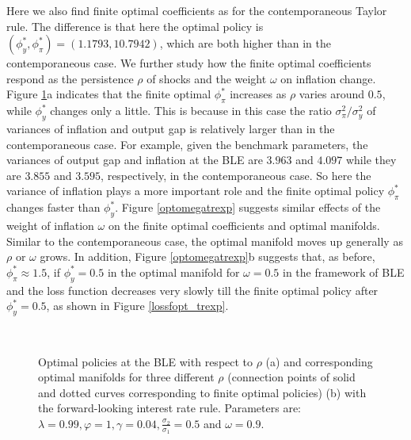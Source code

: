 
Here we also find finite optimal coefficients as for the contemporaneous Taylor rule. The difference is that here the optimal policy is $(\phi_y^*, \phi_\pi^*)=(1.1793,10.7942)$, which are both higher than in the contemporaneous case. We further study how the finite optimal coefficients respond as the persistence $\rho$ of shocks and the weight $\omega$ on inflation change. Figure \ref{optrhotrexp}a indicates that the finite optimal $\phi_\pi^*$ increases as $\rho$ varies around $0.5$, while $\phi_y^*$ changes only a little. This is because in this case the ratio $\sigma_\pi^2/\sigma_y^2$  of variances of inflation and output gap is relatively larger than in the contemporaneous case. For example, given the benchmark parameters, the variances of output gap and inflation at the BLE are $3.963$ and $4.097$ while they are $3.855$ and $3.595$, respectively, in the contemporaneous case. So here the variance of inflation plays a more important role and the finite optimal policy $\phi_\pi^*$ changes faster than $\phi_y^*$. Figure \ref{optomegatrexp} suggests similar effects of the weight of inflation $\omega$ on the finite optimal coefficients and optimal manifolds. Similar to the contemporaneous case, the optimal manifold moves up generally as $\rho$ or $\omega$ grows. In addition, Figure  \ref{optomegatrexp}b suggests that, as before, $\phi_\pi^*\approx 1.5$, if $\phi_y^*=0.5$ in the optimal manifold for $\omega=0.5$ in the framework of BLE and the loss function decreases very slowly till the finite optimal policy after $\phi_y^*=0.5$, as shown in Figure \ref{lossfopt_trexp}.

 \begin{figure}
    \begin{center}
          \mbox{\quad
        }
        \end{center}
   \caption{ \label{optrhotrexp}
   Optimal policies at the BLE with respect to $\rho$ (a) and corresponding optimal manifolds for three different $\rho$ (connection points of solid and dotted curves corresponding to finite optimal policies) (b) with the forward-looking interest rate rule. Parameters are: $\lambda=0.99, \varphi=1, \gamma=0.04,\frac{\sigma_2}{\sigma_1}=0.5$ and $\omega=0.9$. }
    \end{figure}
    

